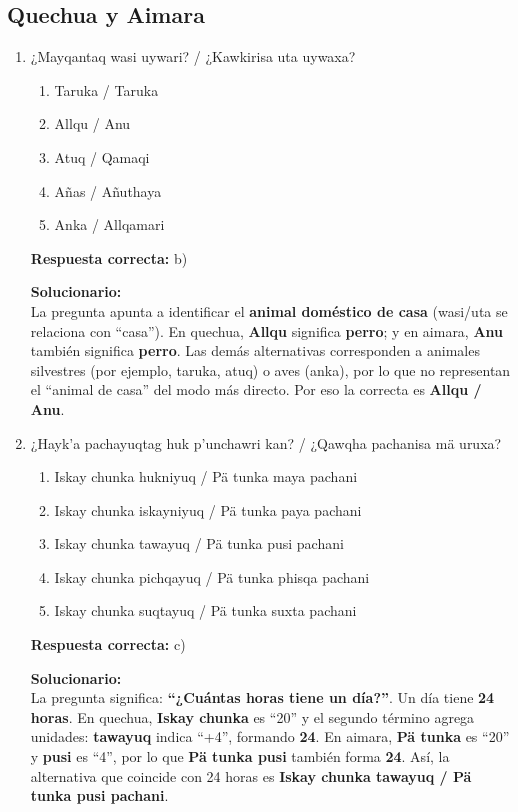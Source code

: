 \subsection*{Quechua y Aimara}

\begin{enumerate}
	
\item ¿Mayqantaq wasi uywari? / ¿Kawkirisa uta uywaxa?
\begin{enumerate}[label=\alph*)]
	\item Taruka / Taruka
	\item Allqu / Anu
	\item Atuq / Qamaqi
	\item Añas / Añuthaya
	\item Anka / Allqamari
\end{enumerate}

\textbf{Respuesta correcta:} b)

\vspace{2mm}
\textbf{Solucionario:}\\
La pregunta apunta a identificar el \textbf{animal doméstico de casa} (wasi/uta se relaciona con “casa”). 
En quechua, \textbf{Allqu} significa \textbf{perro}; y en aimara, \textbf{Anu} también significa \textbf{perro}. 
Las demás alternativas corresponden a animales silvestres (por ejemplo, taruka, atuq) o aves (anka), por lo que no representan el “animal de casa” del modo más directo. Por eso la correcta es \textbf{Allqu / Anu}.


\item ¿Hayk'a pachayuqtag huk p'unchawri kan? / ¿Qawqha pachanisa mä uruxa?
\begin{enumerate}[label=\alph*)]
	\item Iskay chunka hukniyuq / Pä tunka maya pachani
	\item Iskay chunka iskayniyuq / Pä tunka paya pachani
	\item Iskay chunka tawayuq / Pä tunka pusi pachani
	\item Iskay chunka pichqayuq / Pä tunka phisqa pachani
	\item Iskay chunka suqtayuq / Pä tunka suxta pachani
\end{enumerate}

\textbf{Respuesta correcta:} c)

\vspace{2mm}
\textbf{Solucionario:}\\
La pregunta significa: \textbf{“¿Cuántas horas tiene un día?”}. Un día tiene \textbf{24 horas}.  
En quechua, \textbf{Iskay chunka} es “20” y el segundo término agrega unidades: \textbf{tawayuq} indica “+4”, formando \textbf{24}.  
En aimara, \textbf{Pä tunka} es “20” y \textbf{pusi} es “4”, por lo que \textbf{Pä tunka pusi} también forma \textbf{24}.  
Así, la alternativa que coincide con 24 horas es \textbf{Iskay chunka tawayuq / Pä tunka pusi pachani}.

\end{enumerate}


